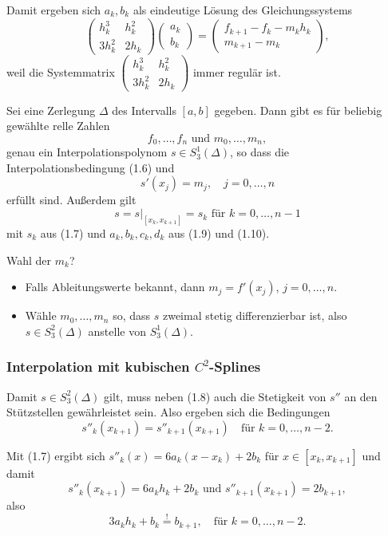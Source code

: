Damit ergeben sich $a_k, b_k$ als eindeutige Lösung des Gleichungssystems
\begin{equation}
 \begin{pmatrix} h_k^3 & h_k^2 \\ 3 h_k^2 & 2 h_k \end{pmatrix}
 \begin{pmatrix} a_k \\ b_k \end{pmatrix} =
 \begin{pmatrix} f_{k+1} - f_k - m_k h_k \\ m_{k+1} - m_k \end{pmatrix},
\end{equation}
weil die Systemmatrix $\begin{pmatrix} h_k^3 & h_k^2 \\ 3 h_k^2 & 2 h_k \end{pmatrix}$ immer regulär ist.

\begin{thm}
 Sei eine Zerlegung $\Delta$ des Intervalls $[a,b]$ gegeben. Dann gibt es für beliebig gewählte relle Zahlen 
 \[ f_0, \ldots, f_n \text{ und } m_0, \ldots, m_n, \]
 genau ein Interpolationspolynom $s \in S_3^1(\Delta)$, so dass die Interpolationsbedingung (1.6) und 
 \[ s'(x_j) = m_j, \quad j = 0, \ldots, n \]
 erfüllt sind. Außerdem gilt
 \[ s = s|_{[x_k, x_{k+1}]} = s_k \text{ für } k = 0, \ldots, n-1 \]
 mit $s_k$ aus (1.7) und $a_k, b_k, c_k, d_k$ aus (1.9) und (1.10).
\end{thm}

Wahl der $m_k$?
\begin{itemize}
 \item Falls Ableitungswerte bekannt, dann $m_j = f'(x_j)$, $j=0, \ldots, n$.
 \item Wähle $m_0, \ldots, m_n$ so, dass $s$ zweimal stetig differenzierbar ist, also $s \in S_3^2(\Delta)$ anstelle von $S_3^1(\Delta)$.
\end{itemize}

\subsubsection{Interpolation mit kubischen \texorpdfstring{$C^2$}{C2}-Splines}
Damit $s \in S_3^2(\Delta)$ gilt, muss neben (1.8) auch die Stetigkeit von $s''$ an den Stützstellen gewährleistet sein. Also ergeben sich die Bedingungen
\[ s''_k(x_{k+1}) = s''_{k+1}(x_{k+1}) \quad \text{für } k = 0, \ldots, n-2. \]

Mit (1.7) ergibt sich $s''_k(x) = 6 a_k (x-x_k) + 2 b_k$ für $x \in [x_k,x_{k+1}]$ und damit
\[ s''_k(x_{k+1}) = 6 a_k h_k + 2 b_k \text{ und }
   s''_{k+1}(x_{k+1}) = 2 b_{k+1}, \]
also
\begin{equation}
 3 a_k h_k + b_k \overset{!}{=} b_{k+1}, \quad \text{für } k=0, \ldots, n-2.
\end{equation}

